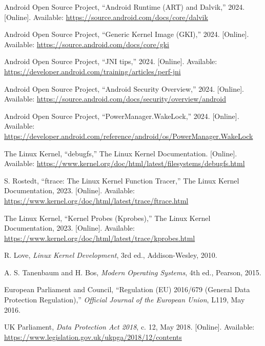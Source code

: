 \documentclass[a4paper,12pt]{report}
\begin{document}
\begin{thebibliography}{99}
Android Open Source Project, “Android Runtime (ART) and Dalvik,” 2024. [Online]. Available: \url{https://source.android.com/docs/core/dalvik}

Android Open Source Project, “Generic Kernel Image (GKI),” 2024. [Online]. Available: \url{https://source.android.com/docs/core/gki}

Android Open Source Project, “JNI tips,” 2024. [Online]. Available: \url{https://developer.android.com/training/articles/perf-jni}

Android Open Source Project, “Android Security Overview,” 2024. [Online]. Available: \url{https://source.android.com/docs/security/overview/android}

Android Open Source Project, “PowerManager.WakeLock,” 2024. [Online]. Available: \url{https://developer.android.com/reference/android/os/PowerManager.WakeLock}

The Linux Kernel, “debugfs,” The Linux Kernel Documentation. [Online]. Available: \url{https://www.kernel.org/doc/html/latest/filesystems/debugfs.html}

S. Rostedt, “ftrace: The Linux Kernel Function Tracer,” The Linux Kernel Documentation, 2023. [Online]. Available: \url{https://www.kernel.org/doc/html/latest/trace/ftrace.html}

The Linux Kernel, “Kernel Probes (Kprobes),” The Linux Kernel Documentation, 2023. [Online]. Available: \url{https://www.kernel.org/doc/html/latest/trace/kprobes.html}

R. Love, \emph{Linux Kernel Development}, 3rd ed., Addison-Wesley, 2010.

A. S. Tanenbaum and H. Bos, \emph{Modern Operating Systems}, 4th ed., Pearson, 2015.

European Parliament and Council, “Regulation (EU) 2016/679 (General Data Protection Regulation),” \emph{Official Journal of the European Union}, L119, May 2016.

UK Parliament, \emph{Data Protection Act 2018}, c. 12, May 2018. [Online]. Available: \url{https://www.legislation.gov.uk/ukpga/2018/12/contents}

\end{thebibliography}

\appendix
\end{document}
